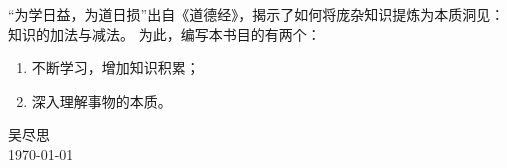 \documentclass[../main.tex]{subfiles}
\begin{document}
``为学日益，为道日损''出自《道德经》，揭示了如何将庞杂知识提炼为本质洞见：知识的加法与减法。
为此，编写本书目的有两个：
\begin{enumerate}[itemsep=0pt, parsep=0pt, topsep=0pt, partopsep=0pt]
  \item 不断学习，增加知识积累；
  \item 深入理解事物的本质。
\end{enumerate}

\begin{flushright}
  吴尽思 \\ \today
\end{flushright}
\end{document}
